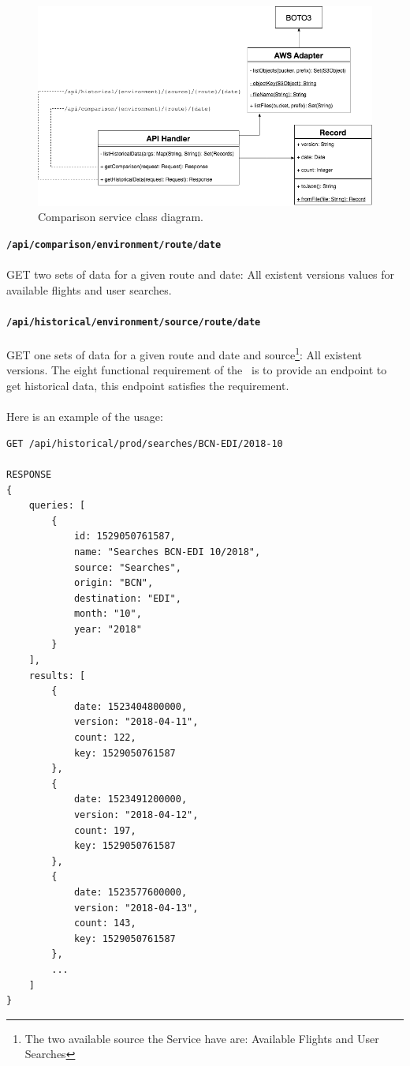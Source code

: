 \begin{figure}[H]
\centering
\includegraphics[scale=0.5]{diagrams/server-architecture.png}
\caption{Comparison service class diagram.}
\end{figure}

\textbf{\texttt{/api/comparison/{environment}/{route}/{date}}}
\\\\
GET two sets of data for a given route and date: All existent versions values for available flights and user searches.
\\\\
\textbf{\texttt{/api/historical/{environment}/{source}/{route}/{date}}}
\\\\
GET one sets of data for a given route and date and source\footnote{The two available source the Service have are: Available Flights and User Searches}: All existent versions. The eight functional requirement of the \thesis\ is to provide an endpoint to get historical data, this endpoint satisfies the requirement.
\\\\
Here is an example of the usage:

\begin{verbatim}
GET /api/historical/prod/searches/BCN-EDI/2018-10

RESPONSE
{
    queries: [
        {
            id: 1529050761587,
            name: "Searches BCN-EDI 10/2018",
            source: "Searches",
            origin: "BCN",
            destination: "EDI",
            month: "10",
            year: "2018"
        }
    ],
    results: [
        {
            date: 1523404800000,
            version: "2018-04-11",
            count: 122,
            key: 1529050761587
        },
        {
            date: 1523491200000,
            version: "2018-04-12",
            count: 197,
            key: 1529050761587
        },
        {
            date: 1523577600000,
            version: "2018-04-13",
            count: 143,
            key: 1529050761587
        },
        ...
    ]
}
\end{verbatim}

